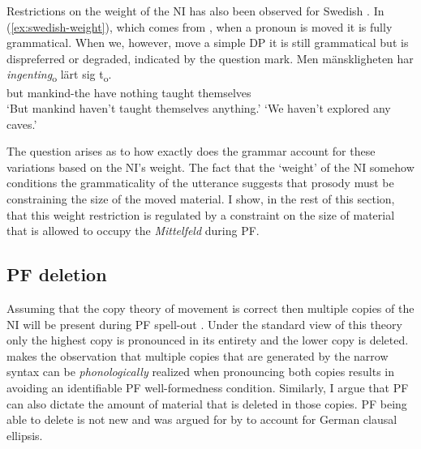 \documentclass[12pt, letterpaper]{article}
\begin{document}
Restrictions on the weight of the NI has also been observed for Swedish \citep{penkaNegativeIndefinites2011}. In (\ref{ex:swedish-weight}), which comes from \citet{penkaNegativeIndefinites2011}, when a pronoun is moved it is fully grammatical. When we, however, move a simple DP it is still grammatical but is dispreferred or degraded, indicated by the question mark. 
	\ea \label{ex:swedish-weight}
		\ea 
		\gll Men mänskligheten har \textit{ingenting}\textsubscript{o} lärt sig t\textsubscript{o}.\\
		but mankind-the have nothing taught themselves\\
		\glt `But mankind haven't taught themselves anything.'
		\glt `We haven't explored any caves.'
		\z 
	\z 

The question arises as to how exactly does the grammar account for these variations based on the NI's weight. The fact that the `weight' of the NI somehow conditions the grammaticality of the utterance suggests that prosody must be constraining the size of the moved material. I show, in the rest of this section, that this weight restriction is regulated by a constraint on the size of material that is allowed to occupy the \emph{Mittelfeld} during PF.

\subsection{PF deletion} \label{sec:NEXT}

Assuming that the copy theory of movement is correct then multiple copies of the NI will be present during PF spell-out \citep{chomskyMinimalistProgramLinguistic1993}. Under the standard view of this theory only the highest copy is pronounced in its entirety and the lower copy is deleted. \citet{kandybowiczGrammarRepetitionNupe2008} makes the observation that multiple copies that are generated by the narrow syntax can be \emph{phonologically} realized when pronouncing both copies results in avoiding an identifiable PF well-formedness condition. Similarly, I argue that PF can also dictate the amount of material that is deleted in those copies. PF being able to delete is not new and was argued for by \citet{ottDeletionClausalEllipsis2016} to account for German clausal ellipsis. 
\end{document}
